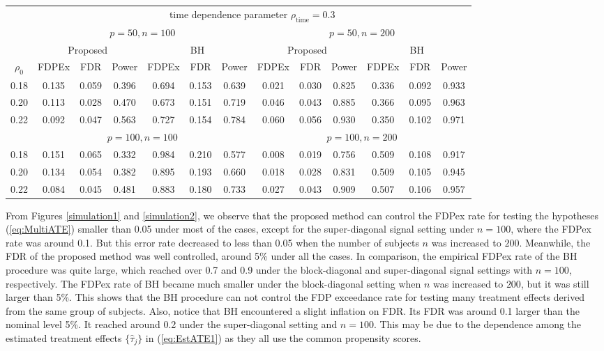 \documentclass[12pt]{article}
\theoremstyle{definition}
\begin{document}
\begin{table}[!htb]
\begin{center}
\begin{tabular}{c|ccc|ccc|ccc|ccc}
 & \multicolumn{12}{c}{time dependence parameter $\rho_{\mathrm{\scriptstyle time}} = 0.3$} 
\\ \cline{2-13} 
 & \multicolumn{6}{c|}{$p = 50, n = 100$} & \multicolumn{6}{c}{$p = 50, n = 200$}
\\ \cline{2-13} 
 & \multicolumn{3}{c|}{Proposed} & \multicolumn{3}{c|}{BH} & \multicolumn{3}{c|}{Proposed} & \multicolumn{3}{c}{BH} 
\\ \cline{2-13} 
$\rho_0$ & FDPEx & FDR & Power & FDPEx & FDR & Power & FDPEx & FDR & Power & FDPEx & FDR & Power 
\\ \hline
0.18 &0.135&0.059&0.396&0.694&0.153&0.639 &0.021&0.030&0.825&0.336&0.092&0.933
\\ \cline{2-13}
0.20 &0.113&0.028&0.470&0.673&0.151&0.719 &0.046&0.043&0.885&0.366&0.095&0.963
\\ \cline{2-13}
0.22 &0.092&0.047&0.563&0.727&0.154&0.784 &0.060&0.056&0.930&0.350&0.102&0.971
\\ \hline
 & \multicolumn{6}{c|}{$p = 100, n = 100$} & \multicolumn{6}{c}{$p = 100, n = 200$}
\\ \hline
0.18 &0.151&0.065&0.332&0.984&0.210&0.577 &0.008&0.019&0.756&0.509&0.108&0.917
\\ \cline{2-13}
0.20 &0.134&0.054&0.382&0.895&0.193&0.660 &0.018&0.028&0.831&0.509&0.105&0.945
\\ \cline{2-13}
0.22 &0.084&0.045&0.481&0.883&0.180&0.733 &0.027&0.043&0.909&0.507&0.106&0.957
\\ \hline\hline

\end{tabular}		
\end{center}
\end{table}
\fi

From Figures \ref{simulation1} and \ref{simulation2}, we observe that the proposed method can control the FDPex rate for testing the hypotheses (\ref{eq:MultiATE}) smaller than 0.05 under most of the cases, except for the super-diagonal signal setting under $n = 100$, where the FDPex rate was around 0.1. But this error rate decreased to less than 0.05 when the number of subjects $n$ was increased to $200$.
Meanwhile, the FDR of the proposed method was well controlled, around 5\% under all the cases. 
In comparison, the empirical FDPex rate of the BH procedure was quite large, which reached over 0.7 and 0.9 under the block-diagonal and super-diagonal signal settings with $n = 100$, respectively.
The FDPex rate of BH became much smaller under the block-diagonal setting when $n$ was increased to $200$, but it was still larger than 5\%. 
This shows that the BH procedure can not control the FDP exceedance rate for testing many treatment effects derived from the same group of subjects.
Also, notice that BH encountered a slight inflation on FDR. Its FDR was around 0.1 larger than the nominal level 5\%. 
It reached around 0.2 under the super-diagonal setting and $n = 100$. 
This may be due to the dependence among the estimated treatment effects $\{\hat{\tau}_j\}$ in (\ref{eq:EstATE1}) as they all use the common propensity scores.
\end{document}
